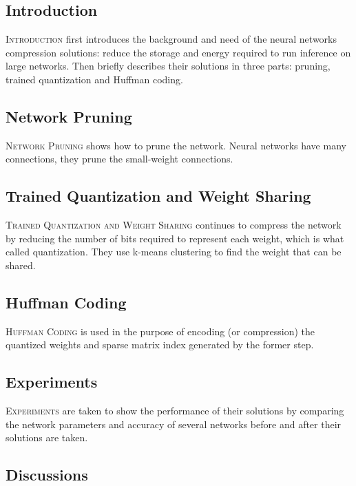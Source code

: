 \documentclass{article} %
\begin{document}
\subsection{Introduction}

\label{introduction}
\textsc{Introduction} first introduces the background and need of the 
neural networks compression solutions: reduce the storage and energy required 
to run inference on large networks. Then briefly describes their solutions in three
parts: pruning, trained quantization and Huffman coding.

\subsection{Network Pruning} 

\textsc{Network Pruning} shows how to prune the network. Neural networks 
have many connections, they prune the small-weight connections.

\subsection{Trained Quantization and Weight Sharing} 

\textsc{Trained Quantization and Weight Sharing} continues to compress 
the network by reducing the number of bits required to represent each weight, which 
is what called quantization. They use k-means clustering to find the weight that 
can be shared. 

\subsection{Huffman Coding} 

\textsc{Huffman Coding} is used in the purpose of encoding (or compression) 
the quantized weights and sparse matrix index generated by the former step.

\subsection{Experiments} 

\textsc{Experiments} are taken to show the performance of their solutions by 
comparing the network parameters and accuracy of several networks before and after 
their solutions are taken.

\subsection{Discussions} 
\end{document}
